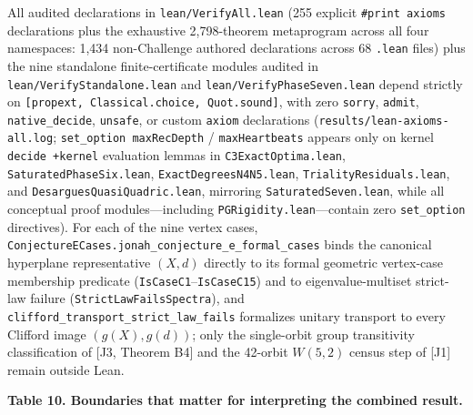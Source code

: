 \documentclass[11pt,a4paper]{article}
\begin{document}
All audited declarations in \nolinkurl{lean/VerifyAll.lean} (255 explicit \texttt{\#print axioms} declarations plus the exhaustive 2,798-theorem metaprogram across all four namespaces: 1,434 non-Challenge authored declarations across 68 \texttt{.lean} files) plus the nine standalone finite-certificate modules audited in \nolinkurl{lean/VerifyStandalone.lean} and \nolinkurl{lean/VerifyPhaseSeven.lean} depend strictly on
\texttt{{[}propext,\ Classical.choice,\ Quot.sound{]}}, with zero \texttt{sorry}, \texttt{admit}, \texttt{native\_decide}, \texttt{unsafe}, or
custom \texttt{axiom} declarations (\nolinkurl{results/lean-axioms-all.log};
\texttt{set\_option\ maxRecDepth} / \texttt{maxHeartbeats} appears only on kernel \texttt{decide\ +kernel} evaluation lemmas in
\nolinkurl{C3ExactOptima.lean}, \nolinkurl{SaturatedPhaseSix.lean}, \nolinkurl{ExactDegreesN4N5.lean}, \nolinkurl{TrialityResiduals.lean}, and \nolinkurl{DesarguesQuasiQuadric.lean}, mirroring \nolinkurl{SaturatedSeven.lean},
while all conceptual proof modules—including \nolinkurl{PGRigidity.lean}—contain zero \texttt{set\_option} directives). For each of the nine vertex cases,
\nolinkurl{ConjectureECases.jonah_conjecture_e_formal_cases} binds the canonical hyperplane representative \((X,d)\)
directly to its formal geometric vertex-case membership predicate (\texttt{IsCaseC1}--\texttt{IsCaseC15}) and to
eigenvalue-multiset strict-law failure (\nolinkurl{StrictLawFailsSpectra}), and \nolinkurl{clifford_transport_strict_law_fails}
formalizes unitary transport to every Clifford image \((g(X), g(d))\); only the single-orbit group transitivity
classification of {[}J3, Theorem B4{]} and the 42-orbit \(W(5,2)\) census step of {[}J1{]} remain outside Lean.

\textbf{Table 10. Boundaries that matter for interpreting the combined result.}
\end{document}
